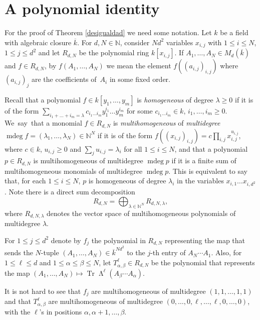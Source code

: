 \documentclass[11pt]{article}
\theoremstyle{plain}
\theoremstyle{definition}
\newcommand{\NN}{\mathbb{N}}
\DeclareMathOperator{\mdeg}{mdeg}
\DeclareMathOperator{\Tr}{Tr}
\DeclareMathOperator{\Wedge}{\mathsf{\Lambda}}
\begin{document}
\section{A polynomial identity}\label{secciontres}

For the proof of Theorem \ref{desigualdad} we need some notation. Let $k$ be a field with algebraic closure $\overline{k}$. For $d,N\in \NN$, consider $Nd^2$ variables $x_{i,j}$ with $1\leq i\leq N$, $1 \leq j \leq d^{2}$ and let $R_{d,N}$ be the polynomial ring $k[x_{i,j}]$. If $A_1,\dots,A_N \in M_{d}(\overline{k})$ and $f\in R_{d,N}$, by $f(A_1,\dots,A_N)$ we mean the element $f((a_{i,j})_{i,j})$ where $(a_{i,j})_{j}$ are the coefficients of~$A_i$ in some fixed order.

Recall that a polynomial $f\in k[y_1,\dots,y_m]$ is \textit{homogeneous} of degree $\lambda\geq 0$ if it is of the form $\sum_{i_1+\dots+i_m=\lambda}{c_{i_1\dots i_m}y_{1}^{i_1}\dots y_{m}^{i_m}}$ for some $c_{i_1\dots i_m}\in k$, \hbox{$i_1,\dots,i_m\geq 0$}. We~say~that a monomial $f\in R_{d,N}$ is \textit{multihomogeneous} of \textit{multidegree} $\mdeg{f}=(\lambda_1,\dots,\lambda_N) \in {\NN}^{N}$ if it is of the form $f((x_{i,j})_{i,j})=c\prod_{i,j}x^{u_{i,j}}_{i,j}$, where $c\in k$, $u_{i,j}\geq 0$ and $\sum_{j}{u_{i,j}}=\lambda_{i}$ for all $1\leq i\leq N$, and that a polynomial $p\in R_{d,N}$ is multihomogeneous of multidegree $\mdeg{p}$ if it is a finite sum of multihomogeneous monomials of multidegree $\mdeg{p}$. This is equivalent to say that, for each $1\leq i\leq N$, $p$ is homogeneous of degree $\lambda_i$ in the variables $x_{i,1} \dots x_{i,d^2}$. Note there is a direct sum decomposition
\begin{equation}\label{directsum}
R_{d,N}=\bigoplus_{\lambda \in {\NN}^{N}}{R_{d,N,\lambda}},
\end{equation} where $R_{d,N,\lambda}$ denotes the vector space of multihomogeneous polynomials of multidegree $\lambda$.

For $1\leq j\leq d^2$ denote by $f_{j}$ the polynomial in $R_{d,N}$ representing the map that sends the $N$-tuple $(A_1,\dots,A_N)\in \overline{k}^{Nd^2}$ to the $j$-th entry of $A_N\cdots A_1$. Also, for $1\leq \ell \leq d$ and $1\leq \alpha \leq \beta \leq N$, let $T^{\ell}_{\alpha,\beta} \in R_{d,N}$ be the polynomial that represents the map $(A_1,\dots,A_N)\mapsto \Tr{\Wedge^{\ell}(A_{\beta}\cdots A_{\alpha})}$.

It is not hard to see that $f_{j}$ are multihomogeneous of multidegree $(1,1,\dots,1,1)$ and that $T_{\alpha,\beta}^{\ell}$ are multihomogeneous of multidegree $(0,\dots,0,\ell,\dots,\ell,0,\dots,0)$, with the $\ell$'s in positions $\alpha,\alpha+1,\dots,\beta$.
\end{document}
